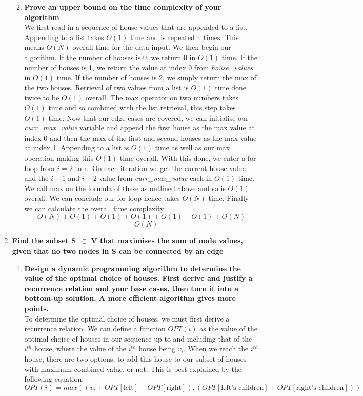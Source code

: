 \documentclass[11pt, oneside]{article}   	%
\begin{document}
\begin{enumerate}
\begin{enumerate}
\begin{enumerate}
		\newpage	
		\end{enumerate}
		\item \textbf{Prove an upper bound on the time complexity of your algorithm}\\
		We first read in a sequence of house values that are appended to a list. Appending to a list takes $O(1)$ time and is repeated n times. This means $O(N)$ overall time for the data input. We then begin our algorithm. If the number of houses is 0, we return 0 in $O(1)$ time. If the number of houses is 1, we return the value at index 0 from \textit{house\_values} in $O(1)$ time. If the number of houses is 2, we simply return the max of the two houses. Retrieval of two values from a list is $O(1)$ time done twice to be $O(1)$ overall. The max operator on two numbers takes $O(1)$ time and so combined with the list retrieval, this step takes $O(1)$ time. Now that our edge cases are covered, we can initialise our \textit{curr\_max\_value} variable and append the first house as the max value at index 0 and then the max of the first and second houses as the max value at index 1. Appending to a list is $O(1)$ time as well as our max operation making this $O(1)$ time overall. With this done, we enter a for loop from $i=2$ to n. On each iteration we get the current house value and the $i-1$ and $i-2$ value from \textit{curr\_max\_value} each in $O(1)$ time. We call max on the formula of these as outlined above and so is $O(1)$ overall. We can conclude our for loop hence takes $O(N)$ time. Finally we can calculate the overall time complexity:
		\[ O(N) + O(1) + O(1) + O(1) + O(1) + O(1) + O(N)\]
		\[ = O(N) \]
	\end{enumerate}
	\newpage
	\item \textbf{Find the subset S $\subset$ V that maximises the sum of node values, given that no two nodes in S can be connected by an edge}
	
	\begin{enumerate}
		\item \textbf{Design a dynamic programming algorithm to determine the value of the optimal choice of houses. First derive and justify a recurrence relation and your base cases, then turn it into a bottom-up solution. A more efficient algorithm gives more points.}\\
		To determine the optimal choice of houses, we must first derive a recurrence relation. We can define a function $OPT(i)$ as the value of the optimal choice of houses in our sequence up to and including that of the $i^{th}$ house, where the value of the $i^{th}$ house being $v_i$. When we reach the $i^{th}$ house, there are two options, to add this house to our subset of houses with maximum combined value, or not. This is best explained by the following equation:
		\[OPT(i) = max((v_i + OPT[\textrm{left}] + OPT[\textrm{right}]), (OPT[\textrm{left's children}] + OPT[\textrm{right's children}])) \]
		

\end{enumerate}
\end{enumerate}
\end{document}
